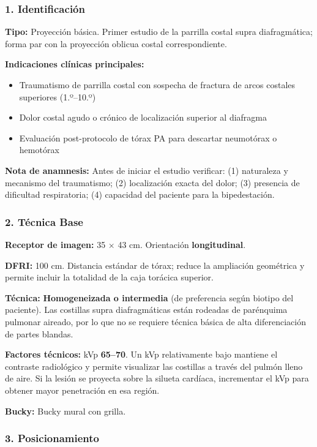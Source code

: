	\subsubsection*{1. Identificación}
	
	\textbf{Tipo:} Proyección básica. Primer estudio de la parrilla costal supra diafragmática; forma par con la proyección oblicua costal correspondiente.
	
	\textbf{Indicaciones clínicas principales:}
	\begin{itemize}
		\item Traumatismo de parrilla costal con sospecha de fractura de arcos costales superiores (1.º--10.º)
		\item Dolor costal agudo o crónico de localización superior al diafragma
		\item Evaluación post-protocolo de tórax PA para descartar neumotórax o hemotórax
	\end{itemize}
	
	\textbf{Nota de anamnesis:} Antes de iniciar el estudio verificar: (1) naturaleza y mecanismo del traumatismo; (2) localización exacta del dolor; (3) presencia de dificultad respiratoria; (4) capacidad del paciente para la bipedestación.
	
	\subsubsection*{2. Técnica Base}
	
	\textbf{Receptor de imagen:} 35 $\times$ 43 cm. Orientación \textbf{longitudinal}.
	
	\textbf{DFRI:} 100 cm. Distancia estándar de tórax; reduce la ampliación geométrica y permite incluir la totalidad de la caja torácica superior.
	
	\textbf{Técnica:} \textbf{Homogeneizada o intermedia} (de preferencia según biotipo del paciente). Las costillas supra diafragmáticas están rodeadas de parénquima pulmonar aireado, por lo que no se requiere técnica básica de alta diferenciación de partes blandas.
	
	\textbf{Factores técnicos:} kVp \textbf{65--70}. Un kVp relativamente bajo mantiene el contraste radiológico y permite visualizar las costillas a través del pulmón lleno de aire. Si la lesión se proyecta sobre la silueta cardíaca, incrementar el kVp para obtener mayor penetración en esa región.
	
	\textbf{Bucky:} Bucky mural con grilla.
	
	\subsubsection*{3. Posicionamiento}
	
